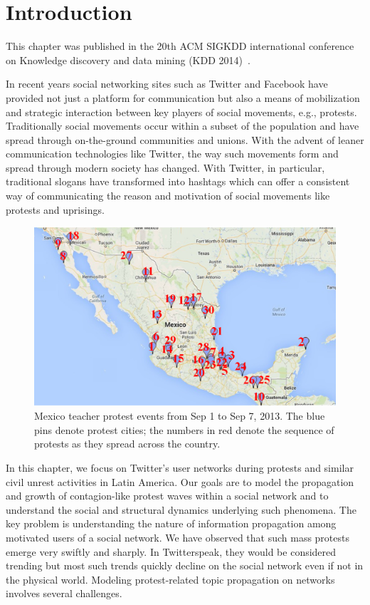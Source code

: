 \section{Introduction}
This chapter was published in the 20th ACM SIGKDD international
conference on Knowledge discovery and data mining (KDD 2014)~\cite{jin2014misinformation}.

In recent years social networking sites such as Twitter and Facebook have
provided not just a platform for communication but also a means
of mobilization and strategic interaction between key players
of social movements, e.g., protests. Traditionally social movements occur
within a subset of the population and have spread through on-the-ground
communities and unions. With the advent of leaner communication
technologies like Twitter, the way such movements form and
spread through modern society has changed. With Twitter, in particular,
traditional slogans have transformed into hashtags which can
offer a consistent way of communicating the reason and
motivation of social movements like protests and uprisings.

\begin{figure}[h]
\centering
\includegraphics[scale=0.4]{figures/mexico_teacher_protest.png}
\caption{Mexico teacher protest events from Sep 1 to Sep 7, 2013. The blue pins denote protest cities; the numbers in red denote the sequence of
protests as they spread across the country.}
\label{fig:mexico_teacher}
\end{figure}


In this chapter, we focus on Twitter's
user networks during protests
and similar civil unrest activities in Latin America. Our goals
are to model the propagation and growth of contagion-like protest
waves within a social network and to understand the social and
structural dynamics underlying such phenomena. The key problem
is understanding the nature of information propagation among motivated
users of a social network. We have observed that such mass
protests emerge very swiftly and sharply. In Twitterspeak, they
would be considered trending but most such trends quickly decline
on the social network even if not in the physical world. Modeling
protest-related topic propagation on networks involves several challenges.

